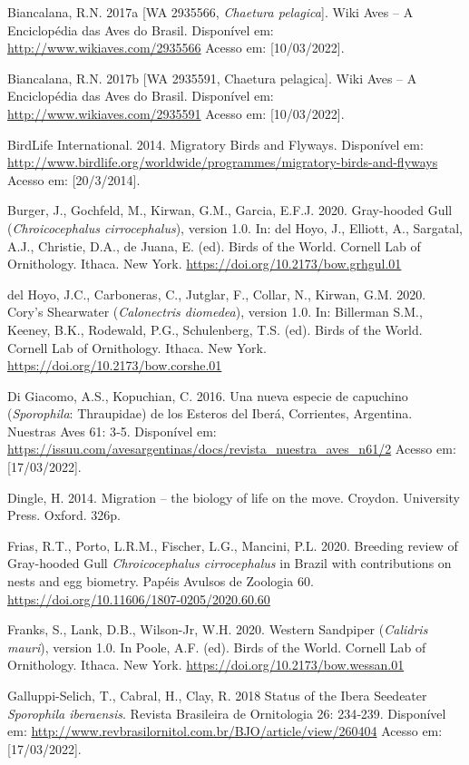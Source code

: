 \documentclass[
  oneside]{scrbook}
\begin{document}
Biancalana, R.N. 2017a {[}WA 2935566, \emph{Chaetura pelagica}{]}. Wiki Aves -- A Enciclopédia das Aves do Brasil. Disponível em: \url{http://www.wikiaves.com/2935566} Acesso em: {[}10/03/2022{]}.

Biancalana, R.N. 2017b {[}WA 2935591, Chaetura pelagica{]}. Wiki Aves -- A Enciclopédia das Aves do Brasil. Disponível em: \url{http://www.wikiaves.com/2935591} Acesso em: {[}10/03/2022{]}.

BirdLife International. 2014. Migratory Birds and Flyways. Disponível em: \url{http://www.birdlife.org/worldwide/programmes/migratory-birds-and-flyways} Acesso em: {[}20/3/2014{]}.

Burger, J., Gochfeld, M., Kirwan, G.M., Garcia, E.F.J. 2020. Gray-hooded Gull (\emph{Chroicocephalus cirrocephalus}), version 1.0. In: del Hoyo, J., Elliott, A., Sargatal, A.J., Christie, D.A., de Juana, E. (ed). Birds of the World. Cornell Lab of Ornithology. Ithaca. New York. \url{https://doi.org/10.2173/bow.grhgul.01}

del Hoyo, J.C., Carboneras, C., Jutglar, F., Collar, N., Kirwan, G.M. 2020. Cory's Shearwater (\emph{Calonectris diomedea}), version 1.0. In: Billerman S.M., Keeney, B.K., Rodewald, P.G., Schulenberg, T.S. (ed). Birds of the World. Cornell Lab of Ornithology. Ithaca. New York. \url{https://doi.org/10.2173/bow.corshe.01}

Di Giacomo, A.S., Kopuchian, C. 2016. Una nueva especie de capuchino (\emph{Sporophila}: Thraupidae) de los Esteros del Iberá, Corrientes, Argentina. Nuestras Aves 61: 3‑5. Disponível em: \url{https://issuu.com/avesargentinas/docs/revista_nuestra_aves_n61/2} Acesso em: {[}17/03/2022{]}.

Dingle, H. 2014. Migration -- the biology of life on the move. Croydon. University Press. Oxford. 326p.

Frias, R.T., Porto, L.R.M., Fischer, L.G., Mancini, P.L. 2020. Breeding review of Gray-hooded Gull \emph{Chroicocephalus cirrocephalus} in Brazil with contributions on nests and egg biometry. Papéis Avulsos de Zoologia 60. \url{https://doi.org/10.11606/1807-0205/2020.60.60}

Franks, S., Lank, D.B., Wilson-Jr, W.H. 2020. Western Sandpiper (\emph{Calidris mauri}), version 1.0. In Poole, A.F. (ed). Birds of the World. Cornell Lab of Ornithology. Ithaca. New York. \url{https://doi.org/10.2173/bow.wessan.01}

Galluppi-Selich, T., Cabral, H., Clay, R. 2018 Status of the Ibera Seedeater \emph{Sporophila iberaensis}. Revista Brasileira de Ornitologia 26: 234‑239. Disponível em: \url{http://www.revbrasilornitol.com.br/BJO/article/view/260404} Acesso em: {[}17/03/2022{]}.
\end{document}
